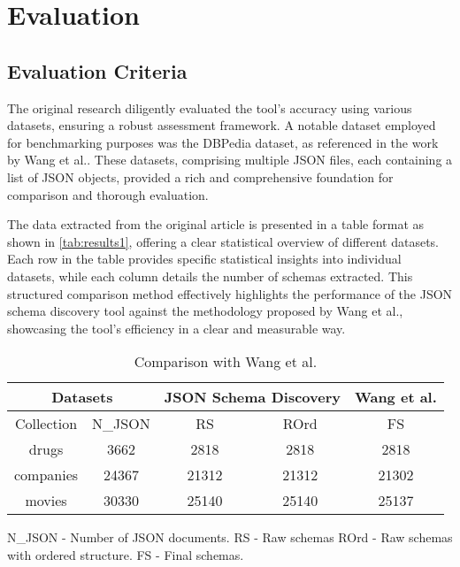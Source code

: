 \documentclass[sigconf, nonacm]{acmart}
\begin{document}
\section{Evaluation}

\subsection{Evaluation Criteria}

The original research diligently evaluated the tool's accuracy using various datasets, ensuring a robust assessment framework. A notable dataset employed for benchmarking purposes was the DBPedia dataset, as referenced in the work by Wang et al.\cite{schemamanagement}. These datasets, comprising multiple JSON files, each containing a list of JSON objects, provided a rich and comprehensive foundation for comparison and thorough evaluation.

The data extracted from the original article is presented in a table format as shown in \autoref{tab:results1}, offering a clear statistical overview of different datasets. Each row in the table provides specific statistical insights into individual datasets, while each column details the number of schemas extracted. This structured comparison method effectively highlights the performance of the JSON schema discovery tool against the methodology proposed by Wang et al., showcasing the tool's efficiency in a clear and measurable way.

\begin{table}[hb]%
	\centering
	\caption{Comparison with Wang et al.}
	\label{tab:results1}
	\begin{tabular}{|c|c|c|c|c|}
		\hline
		\multicolumn{2}{|c|}{Datasets} & \multicolumn{2}{c|}{JSON Schema Discovery} & Wang et al.                 \\
		\hline
		Collection                     & N\_JSON                                    & RS          & ROrd  & FS    \\
		\hline
		drugs                          & 3662                                       & 2818        & 2818  & 2818  \\
		\hline
		companies                      & 24367                                      & 21312       & 21312 & 21302 \\
		\hline
		movies                         & 30330                                      & 25140       & 25140 & 25137 \\
		\hline
	\end{tabular}
	\parbox{0.4\textwidth}{
		\raggedright\footnotesize
		N\_JSON - Number of JSON documents. RS - Raw schemas \newline
		ROrd - Raw schemas with ordered structure. FS - Final schemas.
	}
\end{table}
\end{document}

